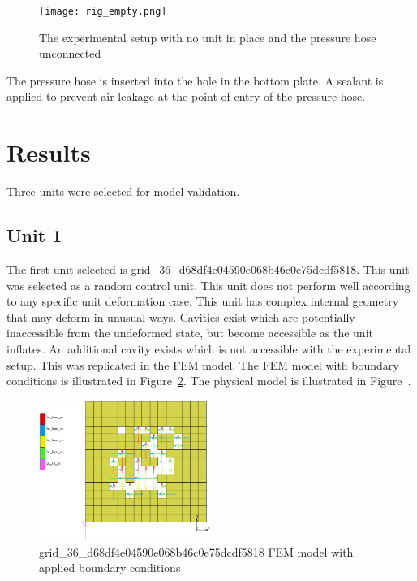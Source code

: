 \begin{figure}[H]
	\centering
	\texttt{[image: rig\_empty.png]}
	\caption[The experimental setup without a unit]{The experimental setup with no unit in place and the pressure hose unconnected}
	\label{fig:expempty}
\end{figure}

The pressure hose is inserted into the hole in the bottom plate. A sealant is applied to prevent air leakage at the point of entry of the pressure hose.

\section{Results}

Three units were selected for model validation.

\subsection{Unit 1}

The first unit selected is grid\_36\_d68df4e04590e068b46c0e75dcdf5818. This unit was selected as a random control unit. This unit does not perform well according to any specific unit deformation case. This unit has complex internal geometry that may deform in unusual ways. Cavities exist which are potentially inaccessible from the undeformed state, but become accessible as the unit inflates. An additional cavity exists which is not accessible with the experimental setup. This was replicated in the FEM model. The FEM model with boundary conditions is illustrated in Figure~\ref{fig:unit1bc}. The physical model is illustrated in Figure~.

\begin{figure}[H]
	\centering
	\includegraphics[width=0.5\textwidth]{unit1bc.png}
	\caption[FEM validation model of unit 1]{grid\_36\_d68df4e04590e068b46c0e75dcdf5818 FEM model with applied boundary conditions}
	\label{fig:unit1bc}
\end{figure}

